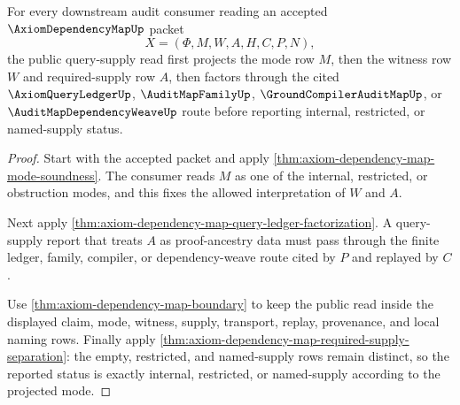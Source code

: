 \begin{theorem}
\label{thm:axiom-dependency-map-mature-query-supply-example}
For every downstream audit consumer reading an accepted $\AxiomDependencyMapUp$ packet
$$
X=(\Phi,M,W,A,H,C,P,N),
$$
the public query-supply read first projects the mode row $M$, then the witness
row $W$ and required-supply row $A$, then factors through the cited
$\AxiomQueryLedgerUp$, $\AuditMapFamilyUp$, $\GroundCompilerAuditMapUp$, or
$\AuditMapDependencyWeaveUp$ route before reporting internal, restricted, or
named-supply status.
\end{theorem}
\begin{proof}
Start with the accepted packet and apply
\autoref{thm:axiom-dependency-map-mode-soundness}. The consumer reads $M$ as
one of the internal, restricted, or obstruction modes, and this fixes the
allowed interpretation of $W$ and $A$.

Next apply \autoref{thm:axiom-dependency-map-query-ledger-factorization}. A
query-supply report that treats $A$ as proof-ancestry data must pass through
the finite ledger, family, compiler, or dependency-weave route cited by $P$
and replayed by $C$.

Use \autoref{thm:axiom-dependency-map-boundary} to keep the public read inside
the displayed claim, mode, witness, supply, transport, replay, provenance, and
local naming rows. Finally apply
\autoref{thm:axiom-dependency-map-required-supply-separation}: the empty,
restricted, and named-supply rows remain distinct, so the reported status is
exactly internal, restricted, or named-supply according to the projected mode.
\end{proof}



